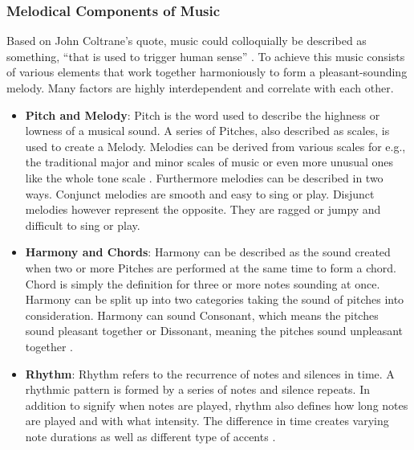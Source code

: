 \subsubsection{Melodical Components of Music}
Based on John Coltrane's quote, music could colloquially be described as something,
“that is used to trigger human sense” \cite{Havers2021Sax}.
To achieve this music consists of various elements that work together harmoniously to form
a pleasant-sounding melody.
Many factors are highly interdependent and correlate with each other. 
\begin{itemize}
    \item \textbf{Pitch and Melody}: Pitch is the word used to describe the highness or lowness of
    a musical sound.
    A series of Pitches, also described as scales, is used to create a Melody.
    Melodies can be derived from various scales for e.g., the traditional major and minor scales
    of music or even more unusual ones like the whole tone scale \cite[86]{Hemming2015}.
    Furthermore melodies can be described in two ways.
    Conjunct melodies are smooth and easy to sing or play.
    Disjunct melodies however represent the opposite.
    They are ragged or jumpy and difficult to sing or play.

    \item \textbf{Harmony and Chords}: Harmony can be described as the sound created when two or more
    Pitches are performed at the same time to form a chord.
    Chord is simply the definition for three or more notes sounding at once.
    Harmony can be split up into two categories taking the sound of pitches into consideration.
    Harmony can sound Consonant, which means the pitches sound pleasant together or Dissonant,
    meaning the pitches sound unpleasant together \cite[94]{Hemming2015}.

    \item \textbf{Rhythm}: Rhythm refers to the recurrence of notes and silences in time.
    A rhythmic pattern is formed by a series of notes and silence repeats.
    In addition to signify when notes are played, rhythm also defines how long notes are played and
    with what intensity.
    The difference in time creates varying note durations as well as different type of accents \cite{MilneMusicFundamentals}.


\end{itemize}
